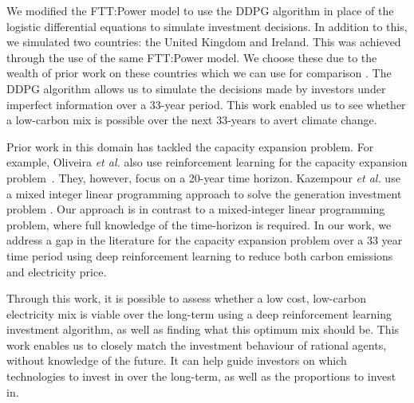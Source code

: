 \documentclass{article}
\begin{document}
We modified the FTT:Power model to use the DDPG algorithm in place of the logistic differential equations to simulate investment decisions. In addition to this, we simulated two countries: the United Kingdom and Ireland. This was achieved through the use of the same FTT:Power model. We choose these due to the wealth of prior work on these countries which we can use for comparison \cite{Hall2016, Hughes2010}. The DDPG algorithm allows us to simulate the decisions made by investors under imperfect information over a 33-year period. This work enabled us to see whether a low-carbon mix is possible over the next 33-years to avert climate change. 


Prior work in this domain has tackled the capacity expansion problem. For example, Oliveira \textit{et al.} also use reinforcement learning for the capacity expansion problem~\cite{Oliveira2018}. They, however, focus on a 20-year time horizon. Kazempour \textit{et al.} use a mixed integer linear programming approach to solve the generation investment problem \cite{Kazempour2011}. Our approach is in contrast to a mixed-integer linear programming problem, where full knowledge of the time-horizon is required. In our work, we address a gap in the literature for the capacity expansion problem over a 33 year time period using deep reinforcement learning to reduce both carbon emissions and electricity price. 

Through this work, it is possible to assess whether a low cost, low-carbon electricity mix is viable over the long-term using a deep reinforcement learning investment algorithm, as well as finding what this optimum mix should be. This work enables us to closely match the investment behaviour of rational agents, without knowledge of the future. It can help guide investors on which technologies to invest in over the long-term, as well as the proportions to invest in.


\end{document}
